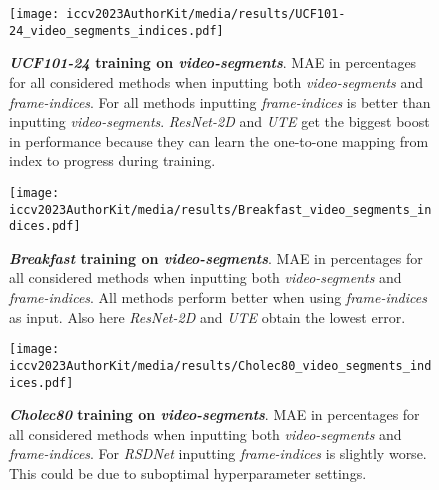 \begin{figure}
\begin{center}
   \texttt{[image: iccv2023AuthorKit/media/results/UCF101-24\_video\_segments\_indices.pdf]}
\end{center}
   \caption{\textbf{
   \textsl{UCF101-24} training on \textsl{video-segments}}. 
   MAE in percentages for all considered methods when inputting both \textsl{video-segments} and \textsl{frame-indices}. 
   For all methods inputting \textsl{frame-indices} is better than inputting \textsl{video-segments}. 
   \textsl{ResNet-2D} and \textsl{UTE} get the biggest boost in performance because they can learn the one-to-one mapping from index to progress during training. 
   }
\label{fig:result_ucf_seg}
\end{figure}
\begin{figure}
\begin{center}
   \texttt{[image: iccv2023AuthorKit/media/results/Breakfast\_video\_segments\_indices.pdf]}
\end{center}
   \caption{\textbf{\textsl{Breakfast} training on \textsl{video-segments}}. 
   MAE in percentages for all considered methods when inputting both \textsl{video-segments} and \textsl{frame-indices}. 
   All methods perform better when using \textsl{frame-indices} as input. 
   Also here \textsl{ResNet-2D} and \textsl{UTE} obtain the lowest error.}
\label{fig:result_breakfast_seg}
\end{figure}
\begin{figure}
\begin{center}
   \texttt{[image: iccv2023AuthorKit/media/results/Cholec80\_video\_segments\_indices.pdf]}
\end{center}
   \caption{\textbf{\textsl{Cholec80} training on \textsl{video-segments}}. 
   MAE in percentages for all considered methods when inputting both \textsl{video-segments} and \textsl{frame-indices}. 
   For \textsl{RSDNet} inputting \textsl{frame-indices} is slightly worse. 
   This could be due to suboptimal hyperparameter settings. 
   }
\label{fig:result_cholec_seg}
\end{figure}

